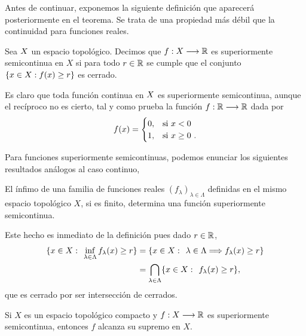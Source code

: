 Antes de continuar, exponemos la siguiente definición que aparecerá posteriormente en el teorema. Se trata de una propiedad más débil que la continuidad para funciones reales. 
\bigskip
\begin{definicion}
Sea $ X $ un espacio topológico. Decimos que $ f:X \longrightarrow \mathbb{R} $ es superiormente semicontinua en $ X $ si para todo $ r \in \mathbb{R} $ se cumple que el conjunto $ \lbrace x \in X : f(x) \geq r \rbrace $ es cerrado.
\end{definicion}
\bigskip
Es claro que toda función continua en $ X $ es superiormente semicontinua, aunque el recíproco no es cierto, tal y como prueba la función $ f:\mathbb{R} \longrightarrow \mathbb{R} $ dada por 
\[
f(x) = \begin{cases}
0, & \mbox{si $ x < 0 $ } \\
1, & \mbox{si $x \geq 0$ }.
\end{cases}
\]

Para funciones superiormente semicontinuas, podemos enunciar los siguientes resultados análogos al caso continuo,
\bigskip
\begin{lemaBox}\label{infDeSupSemi}
El ínfimo de una familia de funciones reales $ (f_\lambda)_{\lambda \in \Lambda} $ definidas en el mismo espacio topológico $ X $, si es finito, determina una función superiormente semicontinua. 
\end{lemaBox}
\bigskip

Este hecho es inmediato de la definición pues dado $ r \in \mathbb{R} $, 
\begin{equation*}
\begin{split}
	\{ x \in X: \hspace{1.5mm} \inf_{ \lambda \in \Lambda}f_\lambda(x) \geq r\} &= \{ x \in X: \hspace{1.5mm} \lambda \in \Lambda \Longrightarrow f_\lambda(x) \geq r\}\\
	&=\bigcap_{\lambda \in \Lambda} \{ x \in X: \hspace{1.5mm}f_\lambda(x) \geq r \},
\end{split}
\end{equation*}
que es cerrado por ser intersección de cerrados. \\

\bigskip
\begin{lemaBox}\label{supConMax}
Si $ X $ es un espacio topológico compacto y $ f:X \longrightarrow \mathbb{R} $ es superiormente semicontinua, entonces $ f $ alcanza su supremo en $ X $.
\end{lemaBox}
\bigskip

